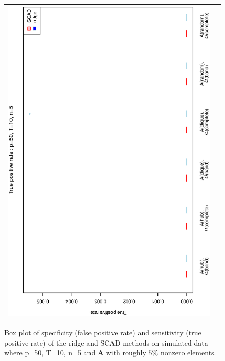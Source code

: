 \begin{figure}[h!]
\begin{tabular}{cc}
\includegraphics[scale=0.45,angle=270]{ROCtpr50T10N5_5.eps}
\end{tabular}
\caption{Box plot of specificity (false positive rate) and sensitivity (true positive rate) of the ridge and SCAD methods on simulated data where p=50, T=10,  n=5  and $\mathbf{A}$ with roughly $5\%$ nonzero elements.}
\label{figSM:RocP50T10N5_5}
\end{figure}
\clearpage



